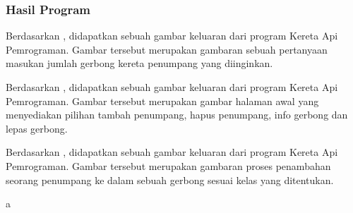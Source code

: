 \documentclass[../main.tex]{subfiles}
\begin{document}
    \newpage
    \subsubsection{\SourceCode}
\begin{indentlevel0}
    \vspace*{-0.15ex}
    
    
    
    
\end{indentlevel0}

    \subsubsection{Hasil Program}

    \begin{indentlevel0}
        \ilz{}Berdasarkan , didapatkan sebuah gambar keluaran dari program Kereta Api Pemrograman. Gambar tersebut merupakan gambaran sebuah pertanyaan masukan jumlah gerbong kereta penumpang yang diinginkan.
    \end{indentlevel0}

    \begin{indentlevel0}
        \ilz{}Berdasarkan , didapatkan sebuah gambar keluaran dari program Kereta Api Pemrograman. Gambar tersebut merupakan gambar halaman awal yang menyediakan pilihan tambah penumpang, hapus penumpang, info gerbong dan lepas gerbong.
    \end{indentlevel0}

    \begin{indentlevel0}
        \ilz{}Berdasarkan , didapatkan sebuah gambar keluaran dari program Kereta Api Pemrograman. Gambar tersebut merupakan gambaran proses penambahan seorang penumpang ke dalam sebuah gerbong sesuai kelas yang ditentukan.
    \end{indentlevel0}

    \newpage
    {\color{white}a\vspace*{-1.5ex}}
\end{document}
